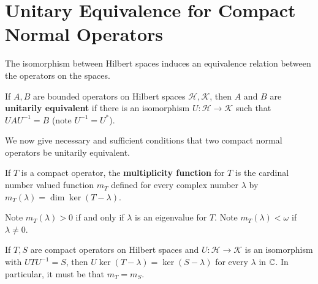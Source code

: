 \section{Unitary Equivalence for Compact Normal Operators}
\label{sec:unitEquiv}

The isomorphism between Hilbert spaces induces an equivalence relation between the operators on the spaces.

\begin{defn}
    If $A,B$ are bounded operators on Hilbert spaces $\mathscr{H},\mathscr{K}$, then $A$ and $B$ are \textbf{unitarily equivalent} if there is an isomorphism $U:\mathscr{H}\rightarrow \mathscr{K}$ such that $UAU^{-1} = B$ (note $U^{-1} = U^*$).
\end{defn}

We now give necessary and sufficient conditions that two compact normal operators be unitarily equivalent.

\begin{defn}
    If $T$ is a compact operator, the \textbf{multiplicity function} for $T$ is the cardinal number valued function $m_T$ defined for every complex number $\lambda$ by $m_T(\lambda) = \dim\ker(T-\lambda)$.
\end{defn}

Note $m_T(\lambda) > 0$ if and only if $\lambda$ is an eigenvalue for $T$. Note $m_T(\lambda) < \omega$ if $\lambda \neq 0$.

If $T,S$ are compact operators on Hilbert spaces and $U:\mathscr{H}\rightarrow \mathscr{K}$ is an isomorphism with $UTU^{-1} = S$, then $U\ker(T-\lambda) = \ker(S-\lambda)$ for every $\lambda$ in $\mathbb C$. In particular, it must be that $m_T = m_S$.

